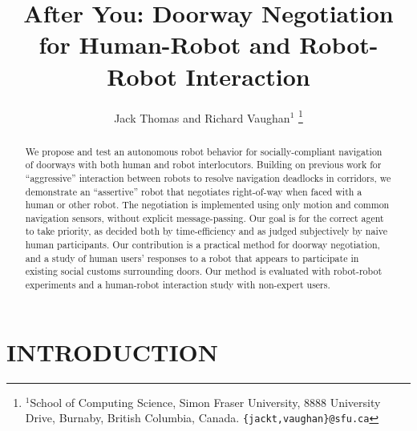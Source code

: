 \documentclass[letterpaper, 10 pt, conference]{ieeeconf}  %
\title{\LARGE \bf
After You: Doorway Negotiation for Human-Robot and Robot-Robot Interaction
}
\author{Jack Thomas and Richard Vaughan$^{1}$%
\thanks{$^{1}$School of Computing Science, Simon Fraser University, 8888 University Drive, Burnaby, British Columbia, Canada.
        {\tt\small \{jackt,vaughan\}@sfu.ca}}%
}
\begin{document}
\maketitle
\thispagestyle{empty}
\pagestyle{empty}


\begin{abstract}

We propose and test an autonomous robot behavior for socially-compliant navigation of doorways with both human and robot interlocutors. Building on previous work for ``aggressive'' interaction between robots to resolve navigation deadlocks in corridors, we demonstrate an ``assertive'' robot that negotiates right-of-way when faced with a human or other robot. The negotiation is implemented using only motion and common navigation sensors, without explicit message-passing. Our goal is for the correct agent to take priority, as decided both by time-efficiency and as judged subjectively by naive human participants. Our contribution is a practical method for doorway negotiation, and a study of human users' responses to a robot that appears to participate in existing social customs surrounding doors. Our method is evaluated with robot-robot experiments and a human-robot interaction study with non-expert users.

\end{abstract}


\section{INTRODUCTION}


\end{document}
